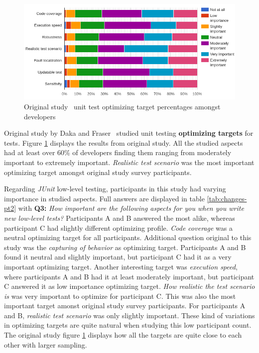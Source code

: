     \begin{figure}[H]
      \begin{center}
        \includegraphics[width=14.7cm]{images/optimize-org.png}
        \caption{Original study~\cite{daka2014survey} unit test optimizing target percentages amongst developers}
        \label{fig:org-optimize}
      \end{center}
    \end{figure}
Original study by Daka and Fraser~\cite{daka2014survey} studied unit testing \textbf{optimizing targets} for tests. Figure \ref{fig:org-optimize}
displays the results from original study. All the studied aspects had at least over 60\% of developers finding them ranging
from moderately important to extremely important. \textit{Realistic test scenario} was the most important optimizing target
amongst original study survey participants.


Regarding \textit{JUnit} low-level testing, participants in this study had varying importance in studied aspects. Full answers are
displayed in table \ref{tab:changes-pt2} with \textbf{Q3:} \textit{How important are the following aspects for you when you write new low-level tests?}
Participants A and B answered
the most alike, whereas participant C had slightly different optimizing profile. \textit{Code coverage}
was a neutral optimizing target for all participants. Additional question original to this study was the \textit{capturing of behavior}
as optimizing target. Participants A and B found it neutral and slightly important,
but participant C had it as a very important optimizing target. Another interesting target was \textit{execution speed},
where participants A and B had it at least moderately important, but participant C
answered it as low importance optimizing target. \textit{How realistic the test scenario is} was very important to optimize for
participant C. This was also the most important target amonst original study survey participants.
For participants A and B, \textit{realistic test scenario} was only slightly important.
These kind of variations in optimizing targets are quite natural when studying this low participant count. The original study
figure \ref{fig:org-optimize} displays how all the targets are quite close to each other with larger sampling.

